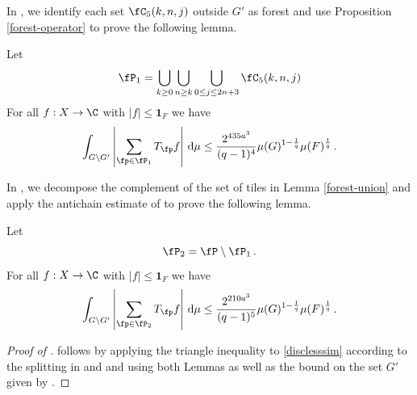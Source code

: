 In , we identify each set $\fC_5(k,n,j)$ outside $G'$ as forest and use Proposition
\ref{forest-operator} to prove the following lemma.

\begin{lemma}
    \label{forest-union}
    \leanok
    Let
    \begin{equation}
        \fP_1 =\bigcup_{k\ge 0}\bigcup_{n\ge k}
        \bigcup_{0\le j\le 2n+3}\fC_5(k,n,j)
    \end{equation}
    For all $f:X\to \C$ with $|f|\le \mathbf{1}_F$ we have
    \begin{equation}
        \label{disclesssim1}
        \int_{G \setminus G'} \left|\sum_{\fp \in \fP_1} T_{\fp} f \right|\, \mathrm{d}\mu \le \frac{2^{435a^3}}{(q-1)^4} \mu(G)^{1 - \frac{1}{q}} \mu(F)^{\frac{1}{q}}\,.
    \end{equation}
\end{lemma}

In , we decompose
the complement of the set of tiles in Lemma
\ref{forest-union} and apply the antichain estimate of
 to prove the following lemma.

\begin{lemma}
    \label{forest-complement}
    \leanok
    Let
    \begin{equation}
        \fP_2 =\fP\setminus \fP_1\,.
    \end{equation}
    For all $f:X\to \C$ with $|f|\le \mathbf{1}_F$ we have
    \begin{equation}
        \label{disclesssim2}
        \int_{G \setminus G'} \left|\sum_{\fp \in \fP_2} T_{\fp} f\right| \, \mathrm{d}\mu \le \frac{2^{210a^3}}{(q-1)^5} \mu(G)^{1 - \frac{1}{q}} \mu(F)^{\frac{1}{q}}\,.
    \end{equation}
\end{lemma}

\begin{proof}[Proof of ]
\leanok
{}
 follows by applying the
triangle inequality to \eqref{disclesssim}
according to the splitting in 
and  and using both Lemmas as well
as the bound on the set $G'$ given by .
\end{proof}

